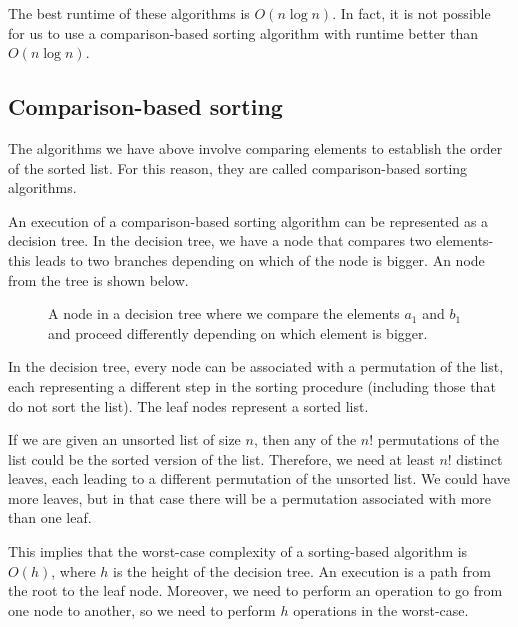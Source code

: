 \documentclass[a4paper, openany]{memoir}
\begin{document}
The best runtime of these algorithms is $O(n \log n)$. In fact, it is not possible for us to use a comparison-based sorting algorithm with runtime better than $O(n \log n)$.

\subsection{Comparison-based sorting}
The algorithms we have above involve comparing elements to establish the order of the sorted list. For this reason, they are called comparison-based sorting algorithms.

An execution of a comparison-based sorting algorithm can be represented as a decision tree. In the decision tree, we have a node that compares two elements- this leads to two branches depending on which of the node is bigger. An node from the tree is shown below.
\begin{figure}[H]
    \centering
    \caption{A node in a decision tree where we compare the elements $a_1$ and $b_1$ and proceed differently depending on which element is bigger.}
\end{figure}
In the decision tree, every node can be associated with a permutation of the list, each representing a different step in the sorting procedure (including those that do not sort the list). The leaf nodes represent a sorted list. 

If we are given an unsorted list of size $n$, then any of the $n!$ permutations of the list could be the sorted version of the list. Therefore, we need at least $n!$ distinct leaves, each leading to a different permutation of the unsorted list. We could have more leaves, but in that case there will be a permutation associated with more than one leaf.

This implies that the worst-case complexity of a sorting-based algorithm is $O(h)$, where $h$ is the height of the decision tree. An execution is a path from the root to the leaf node. Moreover, we need to perform an operation to go from one node to another, so we need to perform $h$ operations in the worst-case.
\end{document}
